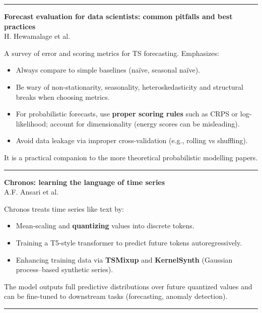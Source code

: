 \documentclass[a5paper]{article}
\providecommand{\tightlist}{%
  \setlength{\itemsep}{0pt}\setlength{\parskip}{0pt}}
\begin{document}
\begin{center}\rule{0.5\linewidth}{0.5pt}\end{center}

\textbf{Forecast evaluation for data scientists: common pitfalls and
best practices}\\
H. Hewamalage et al.

A survey of error and scoring metrics for TS forecasting. Emphasizes:

\begin{itemize}
\tightlist
\item
  Always compare to simple baselines (naïve, seasonal naïve).
\item
  Be wary of non-stationarity, seasonality, heteroskedasticity and
  structural breaks when choosing metrics.
\item
  For probabilistic forecasts, use \textbf{proper scoring rules} such as
  CRPS or log-likelihood; account for dimensionality (energy scores can
  be misleading).
\item
  Avoid data leakage via improper cross-validation (e.g., rolling vs
  shuffling).
\end{itemize}

It is a practical companion to the more theoretical probabilistic
modelling papers.

\begin{center}\rule{0.5\linewidth}{0.5pt}\end{center}

\textbf{Chronos: learning the language of time series}\\
A.F. Ansari et al.

Chronos treats time series like text by:

\begin{itemize}
\tightlist
\item
  Mean-scaling and \textbf{quantizing} values into discrete tokens.
\item
  Training a T5-style transformer to predict future tokens
  autoregressively.
\item
  Enhancing training data via \textbf{TSMixup} and \textbf{KernelSynth}
  (Gaussian process--based synthetic series).
\end{itemize}

The model outputs full predictive distributions over future quantized
values and can be fine-tuned to downstream tasks (forecasting, anomaly
detection).

\begin{center}\rule{0.5\linewidth}{0.5pt}\end{center}
\end{document}
